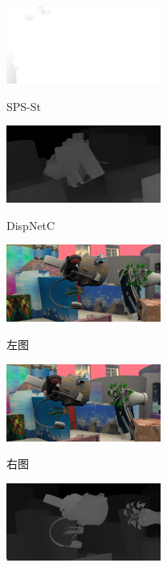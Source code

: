 \begin{figure}[!htb]
	\hfill
	\begin{minipage}{0.3\linewidth}
		\centerline{\includegraphics[width=2in]{figures/cmp_ft3d/sps_000}}
		\vspace{-10pt}
		\centerline{SPS-St}
	\end{minipage}
	\hfill
	\begin{minipage}{0.3\linewidth}
		\centerline{\includegraphics[width=2in]{figures/cmp_ft3d/pred_000}}
		\vspace{-10pt}
		\centerline{DispNetC}
	\end{minipage}
		\begin{minipage}{0.3\linewidth}
		\centerline{\includegraphics[width=2in]{figures/cmp_ft3d/l_005}}
		\vspace{-10pt}
		\centerline{左图}
	\end{minipage}
	\hfill
	\begin{minipage}{.3\linewidth}
		\centerline{\includegraphics[width=2in]{figures/cmp_ft3d/r_005}}
		\vspace{-10pt}
		\centerline{右图}
	\end{minipage}
	\hfill
	\begin{minipage}{0.3\linewidth}
		\centerline{\includegraphics[width=2in]{figures/cmp_ft3d/gt_005}}

\end{minipage}
\end{figure}
